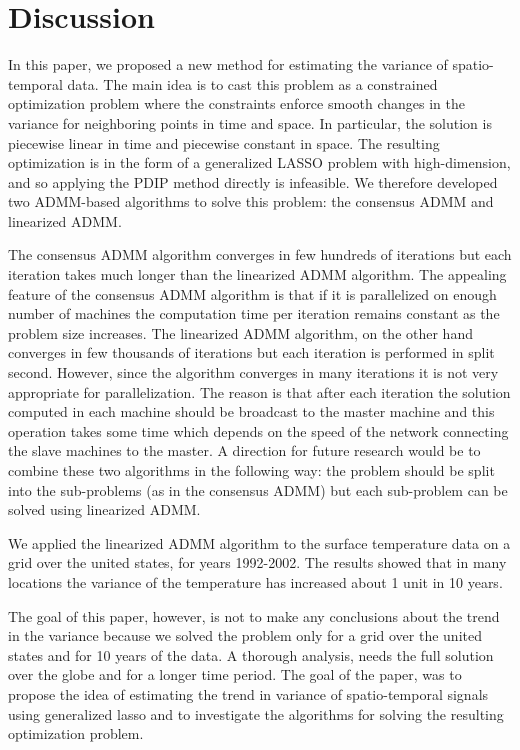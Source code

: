 \documentclass{article}
\begin{document}
 

\section{Discussion}
In this paper, we proposed a new method for estimating the variance of
spatio-temporal data. The main idea is to cast this problem as a
constrained optimization problem where the constraints enforce smooth
changes in the variance for neighboring points in time and space. In
particular, the solution is piecewise linear in time and piecewise
constant in space. The resulting optimization is in the form of a
generalized LASSO problem with high-dimension, and so applying the
PDIP method directly is infeasible. We therefore developed two
ADMM-based algorithms to solve this problem: the consensus ADMM and
linearized ADMM. 

The consensus ADMM algorithm converges in few hundreds of iterations
but each iteration takes much longer than the linearized ADMM
algorithm. The appealing feature of the consensus ADMM algorithm is
that if it is parallelized on enough number of machines the
computation time per iteration remains constant as the problem size
increases. The linearized ADMM algorithm, on the other hand converges
in few thousands of iterations but each iteration is performed in
split second. However, since the algorithm converges in many
iterations it is not very appropriate for parallelization. The reason
is that after each iteration the solution computed in each machine
should be broadcast to the master machine and this operation takes
some time which depends on the speed of the network connecting the
slave machines to the master. A direction for future research would be
to combine these two algorithms in the following way: the problem
should be split into the sub-problems (as in the consensus ADMM) but
each sub-problem can be solved using linearized ADMM. 

We applied the linearized ADMM algorithm to the surface temperature
data on a grid over the united states, for years 1992-2002. The
results showed that in many locations the variance of the temperature
has increased about 1 unit in 10 years. 

The goal of this paper, however, is not to make any conclusions about
the trend in the variance because we solved the problem only for a
grid over the united states and for 10 years of the data. A thorough
analysis, needs the full solution over the globe and for a longer time
period. The goal of the paper, was to propose the idea of estimating
the trend in variance of spatio-temporal signals using generalized
lasso and to investigate the algorithms for solving the resulting
optimization problem. 
\end{document}
